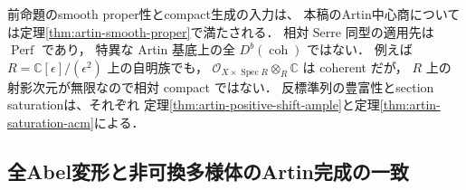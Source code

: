 \begin{remark}[perfect圏と有界coherent導来圏]
前命題のsmooth proper性とcompact生成の入力は、
本稿のArtin中心商については定理\ref{thm:artin-smooth-proper}で満たされる．
相対 Serre 同型の適用先は $\operatorname{Perf}$ であり，
特異な Artin 基底上の全 $D^b(\operatorname{coh})$ ではない．
例えば $R=\mathbb C[\epsilon]/(\epsilon^2)$ 上の自明族でも，
$\mathcal O_{X\times\operatorname{Spec}R}\otimes_R\mathbb C$ は coherent だが，
$R$ 上の射影次元が無限なので相対 compact ではない．
反標準列の豊富性とsection saturationは、それぞれ
定理\ref{thm:artin-positive-shift-ample}と定理\ref{thm:artin-saturation-acm}による．
\end{remark}

\subsection{全Abel変形と非可換多様体のArtin完成の一致}


